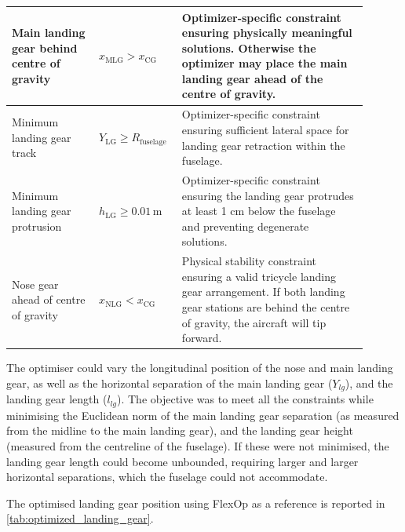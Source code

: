 \begin{longtable}{|p{0.23\linewidth}|p{0.18\linewidth}|p{0.49\linewidth}|}
Main landing gear behind centre of gravity &
$x_{\mathrm{MLG}} > x_{\mathrm{CG}}$ &
Optimizer-specific constraint ensuring physically meaningful solutions. Otherwise the optimizer may place the main landing gear ahead of the centre of gravity. \\
\hline

Minimum landing gear track &
$Y_{\mathrm{LG}} \geq R_{\mathrm{fuselage}}$ &
Optimizer-specific constraint ensuring sufficient lateral space for landing gear retraction within the fuselage. \\
\hline

Minimum landing gear protrusion &
$h_{\mathrm{LG}} \geq 0.01\,\mathrm{m}$ &
Optimizer-specific constraint ensuring the landing gear protrudes at least 1 cm below the fuselage and preventing degenerate solutions. \\
\hline

Nose gear ahead of centre of gravity &
$x_{\mathrm{NLG}} < x_{\mathrm{CG}}$ &
Physical stability constraint ensuring a valid tricycle landing gear arrangement. If both landing gear stations are behind the centre of gravity, the aircraft will tip forward. \\
\hline

\end{longtable}

The optimiser could vary the longitudinal position of the nose and main landing gear, as well as the horizontal separation of the main landing gear ($Y_{lg}$), and the landing gear length ($l_{lg}$). The objective was to meet all the constraints while minimising the Euclidean norm of the main landing gear separation (as measured from the midline to the main landing gear), and the landing gear height (measured from the centreline of the fuselage). If these were not minimised, the landing gear length could become unbounded, requiring larger and larger horizontal separations, which the fuselage could not accommodate. %



The optimised landing gear position using FlexOp as a reference is reported in \autoref{tab:optimized_landing_gear}.


